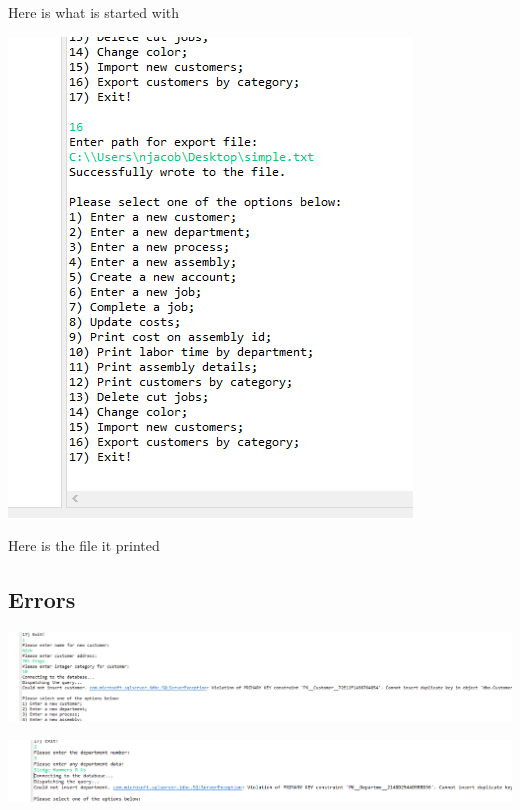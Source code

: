 \documentclass[11pt]{article}
\begin{document}
Here is what is started with


\includegraphics[width = \textwidth]{export.png}

Here is the file it printed


\subsection{Errors}

\includegraphics[width = \textwidth]{error1.png}

\includegraphics[width = \textwidth]{error2.png}
\end{document}
